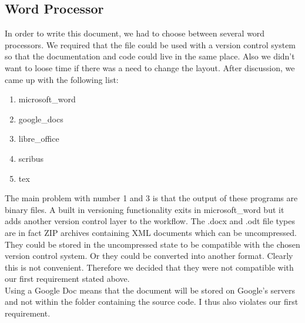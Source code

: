 \subsection{Word Processor}
In order to write this document, we had to choose between several word processors. We required that the file could be used with a version control system so that the documentation and code could live in the same place. Also we didn't want to loose time if there was a need to change the layout. After discussion, we came up with the following list:
\begin{enumerate}
\item \Gls{microsoft_word}
\item \Gls{google_docs}
\item \Gls{libre_office}
\item \Gls{scribus}
\item \Gls{tex}
\end{enumerate}
The main problem with number 1 and 3 is that the output of these programs are binary files. A built in versioning functionality exits in \gls{microsoft_word} but it adds another version control layer to the workflow. The .docx and .odt file types are in fact ZIP archives containing XML documents which can be uncompressed. They could be stored in the uncompressed state to be compatible with the chosen version control system. Or they could be converted into another format. Clearly this is not convenient. Therefore we decided that they were not compatible with our first requirement stated above.\\
Using a Google Doc means that the document will be stored on Google's servers and not within the folder containing the source code. I thus also violates our first requirement.\\
